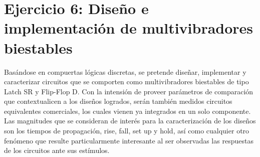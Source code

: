 \section{Ejercicio 6: Dise\~no e implementaci\'on de multivibradores biestables}
Basándose en compuertas lógicas discretas, se pretende diseñar, implementar y caracterizar circuitos que se comporten como multivibradores biestables de tipo Latch SR y 
Flip-Flop D.
Con la intensión de proveer parámetros de comparación que contextualicen a los diseños logrados, serán también medidos circuitos equivalentes comerciales, los cuales vienen 
ya integrados en un solo componente. \\
Las magnitudes que se consideran de interés para la caracterización de los diseños son los tiempos de propagación, rise, fall, set up y hold, así como cualquier otro 
fenómeno que resulte particularmente interesante al ser observadas las respuestas de los circuitos ante sus estímulos.

